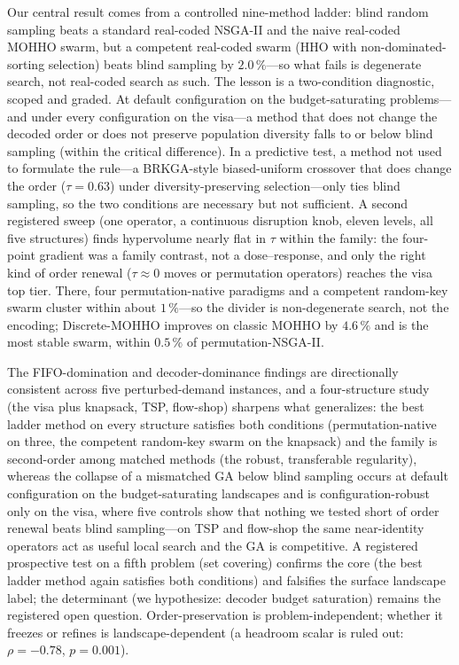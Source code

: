\documentclass[runningheads]{llncs}
\begin{document}
Our central result comes from a controlled nine-method ladder: blind random sampling beats a standard real-coded NSGA-II and the naive real-coded MOHHO swarm, but a competent real-coded swarm (HHO with non-dominated-sorting selection) beats blind sampling by $2.0\,\%$---so what fails is degenerate search, not real-coded search as such. The lesson is a two-condition diagnostic, scoped and graded. At default configuration on the budget-saturating problems---and under every configuration on the visa---a method that does not change the decoded order or does not preserve population diversity falls to or below blind sampling (within the critical difference). In a predictive test, a method not used to formulate the rule---a BRKGA-style biased-uniform crossover that does change the order ($\tau=0.63$) under diversity-preserving selection---only ties blind sampling, so the two conditions are necessary but not sufficient. A second registered sweep (one operator, a continuous disruption knob, eleven levels, all five structures) finds hypervolume nearly flat in $\tau$ within the family: the four-point gradient was a family contrast, not a dose--response, and only the right kind of order renewal ($\tau\approx0$ moves or permutation operators) reaches the visa top tier. There, four permutation-native paradigms and a competent random-key swarm cluster within about $1\,\%$---so the divider is non-degenerate search, not the encoding; Discrete-MOHHO improves on classic MOHHO by $4.6\,\%$ and is the most stable swarm, within $0.5\,\%$ of permutation-NSGA-II.

The FIFO-domination and decoder-dominance findings are directionally consistent across five perturbed-demand instances, and a four-structure study (the visa plus knapsack, TSP, flow-shop) sharpens what generalizes: the best ladder method on every structure satisfies both conditions (permutation-native on three, the competent random-key swarm on the knapsack) and the family is second-order among matched methods (the robust, transferable regularity), whereas the collapse of a mismatched GA below blind sampling occurs at default configuration on the budget-saturating landscapes and is configuration-robust only on the visa, where five controls show that nothing we tested short of order renewal beats blind sampling---on TSP and flow-shop the same near-identity operators act as useful local search and the GA is competitive. A registered prospective test on a fifth problem (set covering) confirms the core (the best ladder method again satisfies both conditions) and falsifies the surface landscape label; the determinant (we hypothesize: decoder budget saturation) remains the registered open question. Order-preservation is problem-independent; whether it freezes or refines is landscape-dependent (a headroom scalar is ruled out: $\rho=-0.78$, $p=0.001$).
\end{document}
